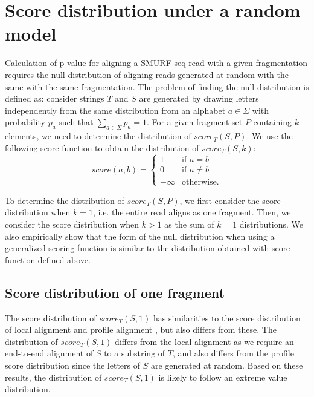 \section{Score distribution under a random model}
Calculation of p-value for aligning a SMURF-seq read with a given
fragmentation requires the null distribution of aligning reads
generated at random with the same with the same fragmentation. The
problem of finding the null distribution is defined as:
consider strings $T$ and $S$ are generated by drawing letters independently
from the same distribution from an alphabet $a \in \Sigma$ with
probability $p_a$ such that $\sum_{a \in \Sigma} p_a = 1$.  For a given
fragment set $P$ containing $k$ elements, we need to determine the
distribution of $score_T(S, P)$.
We use the following score function to obtain the distribution of
$score_T(S,k)$:
\begin{equation*}
\label{exact_score}
score(a,b)=\begin{cases} 1 & \text{if } a = b \\
            0 & \text{if } a\neq b \\
            -\infty & \text{otherwise.}
\end{cases}
\end{equation*}

To determine the distribution of $score_T(S, P)$, we first consider the score
distribution when $k = 1$, i.e. the entire read aligns as one fragment.
Then, we consider the score distribution when $k > 1$ as the sum of $k =
1$ distributions. We also empirically show that the form of the null
distribution when using a generalized scoring function is similar to the
distribution obtained with score function defined above.


\subsection{Score distribution of one fragment}
The score distribution of $score_T(S,1)$ has similarities to the score
distribution of local alignment \cite{} and profile alignment \cite{},
but also differs from these.  The distribution of $score_T(S,1)$ differs
from the local alignment as we require an end-to-end alignment of $S$ to
a substring of $T$, and also differs from the profile score distribution
since the letters of $S$ are generated at random.
Based on these results, the distribution of $score_T(S,1)$ is likely to
follow an extreme value distribution.

